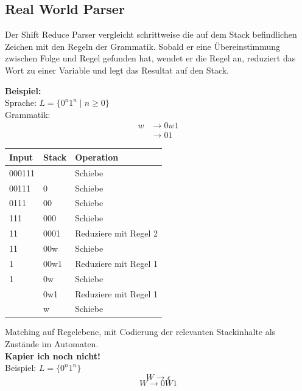 \documentclass[a4paper]{article}
\begin{document}
	
	
\subsection{Real World Parser}
	\begin{multicols}{2}

	\begin{falgo}
	Der Shift Reduce Parser vergleicht schrittweise die auf dem Stack befindlichen Zeichen mit den Regeln der Grammatik. Sobald er eine Übereinstimmung zwischen Folge und Regel gefunden hat, wendet er die Regel an, reduziert das Wort zu einer Variable und legt das Resultat auf den Stack.
	\end{falgo}

	\textbf{Beispiel:} \\\vspace{2mm}
	Sprache: $L=\{0^n1^n \mid n \geq 0 \}$ \\
	Grammatik: \begin{align*} 
		w & \rightarrow 0w1 \\
  & \rightarrow 01
	\end{align*}

	\begin{tabular}{|l|l|l|} \hline
		Input  & Stack & Operation \\\hline
		000111 &       & Schiebe \\
		00111  & 0     & Schiebe \\
		0111   & 00    & Schiebe \\
		111    & 000   & Schiebe \\
		11     & 0001  & Reduziere mit Regel 2 \\
		11     & 00w   & Schiebe \\
		1      & 00w1  & Reduziere mit Regel 1 \\
		1      & 0w    & Schiebe \\
      & 0w1   & Reduziere mit Regel 1 \\
      & w     & Schiebe \\\hline
	\end{tabular}

	\begin{falgo}[LR(0)]
	Matching auf Regelebene, mit Codierung der relevanten Stackinhalte als Zustände im Automaten. \\
	\textbf{Kapier ich noch nicht!} \\
		Beispiel: $L = \{0^n 1^n \}$
		$$ W \rightarrow \epsilon $$
		$$ W \rightarrow 0W1 $$
	\end{falgo}


\end{multicols}
\end{document}
